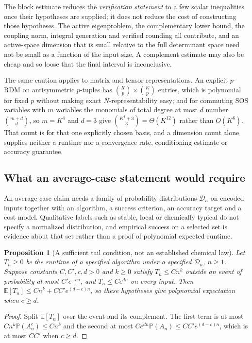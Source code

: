 \documentclass[11pt,a4paper]{article}
\theoremstyle{plain}
\newtheorem{proposition}[theorem]{Proposition}
\theoremstyle{definition}
\theoremstyle{remark}
\begin{document}
The block estimate reduces the \emph{verification statement} to a few scalar
inequalities once their hypotheses are supplied; it does not reduce the cost of
constructing those hypotheses. The active eigenproblem, the complementary lower
bound, the coupling norm, integral generation and verified rounding all
contribute, and an active-space dimension that is small relative to the full
determinant space need not be small as a function of the input size. A complement
estimate may also be cheap and so loose that the final interval is
inconclusive.

The same caution applies to matrix and tensor representations. An explicit
$p$-RDM on antisymmetric $p$-tuples has $\binom Kp\times\binom Kp$ entries,
which is polynomial for fixed $p$ without making exact $N$-representability
easy; and for commuting SOS variables with $m$ variables the monomials of total
degree at most $d$ number $\binom{m+d}{d}$, so $m=K^{4}$ and $d=3$ give
$\binom{K^{4}+3}{3}=\Theta(K^{12})$ rather than $O(K^{6})$. That count is for
that one explicitly chosen basis, and a dimension count alone supplies neither a
runtime nor a convergence rate, conditioning estimate or accuracy guarantee.

\subsection{What an average-case statement would require}
An average-case claim needs a family of probability distributions
$\mathcal D_n$ on encoded inputs together with an algorithm, a success
criterion, an accuracy target and a cost model. Qualitative labels such as
stable, local or chemically typical do not specify a normalized distribution,
and empirical success on a selected set is evidence about that set rather than a
proof of polynomial expected runtime.

\begin{proposition}[A sufficient tail condition, not an established chemical law]
\label{prop:average}
Let $T_n\ge0$ be the runtime of a specified algorithm under a specified
$\mathcal D_n$, $n\ge1$. Suppose constants $C,C',c,d>0$ and $k\ge0$ satisfy
$T_n\le Cn^k$ outside an event of probability at most $C'e^{-cn}$, and
$T_n\le Ce^{dn}$ on every input. Then
$\mathbb E[T_n]\le Cn^k+CC'e^{(d-c)n}$, so these hypotheses give polynomial
expectation when $c\ge d$.
\end{proposition}
\begin{proof}
Split $\mathbb E[T_n]$ over the event and its complement. The first term is at
most $Cn^k\mathbb P(A_n^{c})\le Cn^k$ and the second at most
$Ce^{dn}\mathbb P(A_n)\le CC'e^{(d-c)n}$, which is at most $CC'$ when $c\ge d$.
\end{proof}
\end{document}
